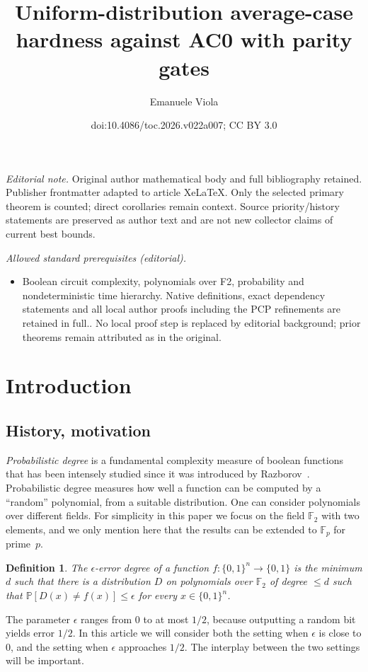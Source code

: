 \documentclass[11pt]{article}
\title{Uniform-distribution average-case hardness against AC0 with parity gates}
\author{Emanuele Viola}
\date{doi:10.4086/toc.2026.v022a007; CC BY 3.0}
\newtheorem{defn}[theorem]{Definition}
\newcommand{\zo}{\{0, 1\}}
\newcommand{\F}{\mathbb{F}}
\renewcommand{\P}{\mathbb{P}}
\newcommand{\eps}{\epsilon}
\newcommand{\e}{\epsilon}
\begin{document}
\maketitle
\noindent\textit{Editorial note.} Original author mathematical body and full bibliography retained. Publisher frontmatter adapted to article XeLaTeX. Only the selected primary theorem is counted; direct corollaries remain context. Source priority/history statements are preserved as author text and are not new collector claims of current best bounds.\par\medskip
\noindent\textit{Allowed standard prerequisites (editorial).}\begin{itemize}
\item Boolean circuit complexity, polynomials over F2, probability and nondeterministic time hierarchy. Native definitions, exact dependency statements and all local author proofs including the PCP refinements are retained in full.. No local proof step is replaced by editorial background; prior theorems remain attributed as in the original.
\end{itemize}\medskip
\section{Introduction}
%
%
%
%

%
%
%
\subsection{History, motivation}  %
\label{preamble}                  %

\emph{Probabilistic degree} is a fundamental complexity measure of
boolean functions that has been intensely studied since it was introduced
by Razborov~\cite{Raz87}. Probabilistic degree measures how well
a function can be computed by a ``random'' polynomial, from a suitable
distribution. One can consider polynomials over different fields.
For simplicity in this paper we focus on the field $\F_{2}$ with
two elements, and we only mention here that the results can be extended
to $\F_{p}$ for prime~$p$.

\begin{defn}
The \emph{$\e$-error degree} of a function $f:\zo^{n}\to\zo$ is
the minimum $d$ such that there is a distribution $D$ on polynomials
over $\F_{2}$ of degree $\le d$ such that
$\P[D(x) \ne f(x)] \le \eps$
for every $x\in\zo^{n}$.
\end{defn}

The parameter $\e$ ranges from $0$ to at most $1/2$, because outputting
a random bit yields error $1/2$. In this %
article  %
we will consider both
the setting when $\e$ is close to $0$, and the setting when $\e$
approaches $1/2$. The interplay between the two settings will be
important.
\end{document}
